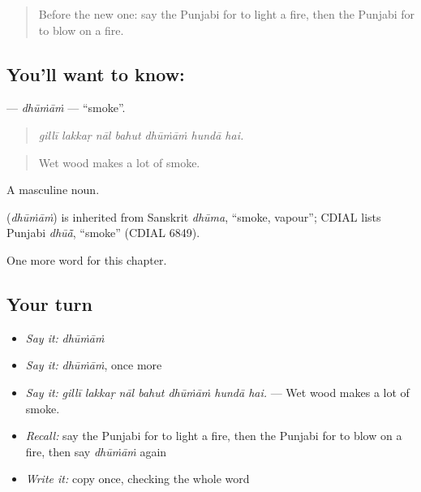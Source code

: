 \label{lesson:PA-C249-dhumam}



\begin{quote}
Before the new one: say the Punjabi for to light a fire, then the Punjabi for to blow on a fire.
\end{quote}

\subsection*{You'll want to know: }
\textbf{} — \emph{dhūṁāṁ} — \textquotedblleft{}smoke\textquotedblright{}.

\begin{quote}
      
\end{quote}

\begin{quote}
\emph{gillī lakkaṛ nāl bahut dhūṁāṁ hundā hai.}
\end{quote}

\begin{quote}
Wet wood makes a lot of smoke.
\end{quote}

A masculine noun.

\begin{cousinweb}
\textbf{} (\emph{dhūṁāṁ}) is inherited from Sanskrit \emph{dhūma}, \textquotedblleft{}smoke, vapour\textquotedblright{}; CDIAL lists Punjabi \emph{dhūā̃}, \textquotedblleft{}smoke\textquotedblright{} (CDIAL 6849).
\end{cousinweb}

\begin{grammarlens}[title={What you've built}]
One more word for this chapter.
\end{grammarlens}

\subsection*{Your turn}
\begin{itemize}
\raggedright
  \item \emph{Say it:} \emph{dhūṁāṁ}
  \item \emph{Say it:} \emph{dhūṁāṁ}, once more
  \item \emph{Say it:} \emph{gillī lakkaṛ nāl bahut dhūṁāṁ hundā hai.} — Wet wood makes a lot of smoke.
  \item \emph{Recall:} say the Punjabi for to light a fire, then the Punjabi for to blow on a fire, then say \emph{dhūṁāṁ} again
  \item \emph{Write it:} copy \textbf{} once, checking the whole word
\end{itemize}

